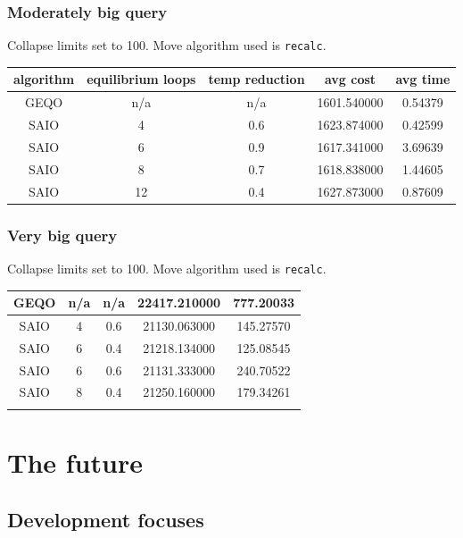 \documentclass{beamer}
\begin{document}
\begin{frame}
  \frametitle{Moderately big query}

  Collapse limits set to 100. Move algorithm used is \texttt{recalc}.

  \begin{center}
    \begin{tabular}{ccccc}
      algorithm & equilibrium loops & temp reduction & avg cost & avg time
      \\ \hline \hline
      GEQO & n/a & n/a & 1601.540000 & 0.54379 \\ \hline
      SAIO & 4 & 0.6 & 1623.874000 & 0.42599 \\ \hline
      SAIO & 6 & 0.9 & 1617.341000 & 3.69639 \\ \hline
      SAIO & 8 & 0.7 & 1618.838000 & 1.44605 \\ \hline
      SAIO & 12 & 0.4 & 1627.873000 & 0.87609 \\ \hline
    \end{tabular}
  \end{center}

\end{frame}

\begin{frame}
  \frametitle{Very big query}

  Collapse limits set to 100. Move algorithm used is \texttt{recalc}.

  \begin{center}
    \begin{tabular}{ccccc}
      GEQO & n/a & n/a & 22417.210000 & 777.20033 \\ \hline
      SAIO & 4 & 0.6 & 21130.063000 & 145.27570 \\ \hline
      SAIO & 6 & 0.4 & 21218.134000 & 125.08545 \\ \hline
      SAIO & 6 & 0.6 & 21131.333000 & 240.70522 \\ \hline
      SAIO & 8 & 0.4 & 21250.160000 & 179.34261 \\ \hline
      \\ \hline \hline
    \end{tabular}
  \end{center}

\end{frame}

\section{The future}
\subsection{Development focuses}
\end{document}
